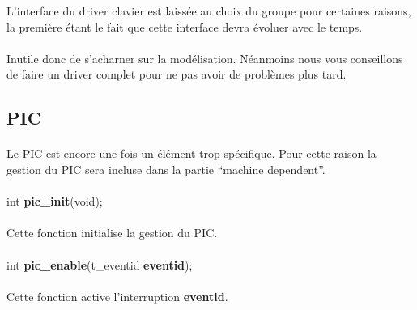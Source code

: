 \documentclass[10pt,a4wide]{article}
\begin{document}
L'interface du driver clavier est laiss\'ee au choix du groupe pour certaines
raisons, la premi\`ere \'etant le fait que cette interface devra \'evoluer
avec le temps.

\paragraph{}

Inutile donc de s'acharner sur la mod\'elisation. N\'eanmoins nous vous
conseillons de faire un driver complet pour ne pas avoir de probl\`emes
plus tard.

\subsection{PIC}

\paragraph{}

Le PIC est encore une fois un \'el\'ement trop sp\'ecifique. Pour cette
raison la gestion du PIC sera incluse dans la partie ``machine dependent''.

\paragraph{}

\hspace{1.5cm}int \textbf{pic\_init}(void);

\paragraph{}

Cette fonction initialise la gestion du PIC.

\paragraph{}

\hspace{1.5cm}int \textbf{pic\_enable}(t\_eventid \textbf{eventid});

\paragraph{}

Cette fonction active l'interruption \textbf{eventid}.

\paragraph{}
\end{document}
